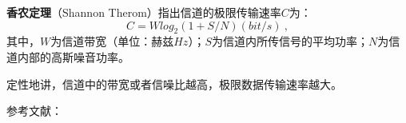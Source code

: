 

\textbf{香农定理}（Shannon Therom）指出信道的极限传输速率$C$为：
\begin{equation}
C=Wlog_2(1+S/N)    (bit/s)~,
\end{equation}
其中，$W$为信道带宽（单位：赫兹$Hz$）；$S$为信道内所传信号的平均功率；$N$为信道内部的高斯噪音功率。

定性地讲，信道中的带宽或者信噪比越高，极限数据传输速率越大。


参考文献：
